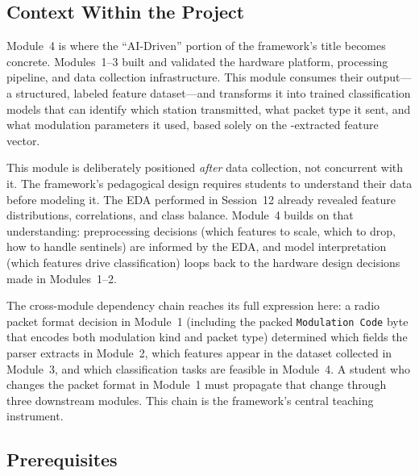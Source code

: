 \documentclass[11pt,letterpaper]{article}
\begin{document}
	\subsection{Context Within the Project}

	Module~4 is where the ``AI-Driven'' portion of the framework's title becomes concrete. Modules~1--3 built and validated the hardware platform, \FPGA{} processing pipeline, and data collection infrastructure. This module consumes their output---a structured, labeled \RF{} feature dataset---and transforms it into trained classification models that can identify which station transmitted, what packet type it sent, and what modulation parameters it used, based solely on the \FPGA{}-extracted feature vector.

	This module is deliberately positioned \emph{after} data collection, not concurrent with it. The framework's pedagogical design requires students to understand their data before modeling it. The EDA performed in Session~12 already revealed feature distributions, correlations, and class balance. Module~4 builds on that understanding: preprocessing decisions (which features to scale, which to drop, how to handle sentinels) are informed by the EDA, and model interpretation (which features drive classification) loops back to the hardware design decisions made in Modules~1--2.

	The cross-module dependency chain reaches its full expression here: a radio packet format decision in Module~1 (including the packed \texttt{Modulation Code} byte that encodes both modulation kind and packet type) determined which fields the \FPGA{} parser extracts in Module~2, which features appear in the dataset collected in Module~3, and which classification tasks are feasible in Module~4. A student who changes the packet format in Module~1 must propagate that change through three downstream modules. This chain is the framework's central teaching instrument.

	\subsection{Prerequisites}
\end{document}
